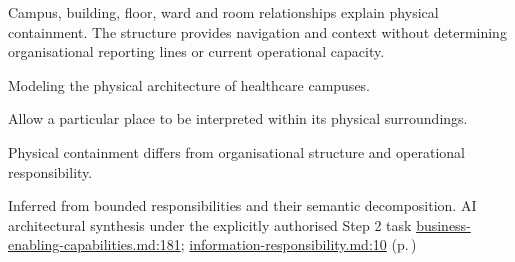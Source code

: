 Campus, building, floor, ward and room relationships explain physical containment. The structure provides navigation and context without determining organisational reporting lines or current operational capacity.



Modeling the physical architecture of healthcare campuses.



Allow a particular place to be interpreted within its physical surroundings.



Physical containment differs from organisational structure and operational responsibility.


Inferred from bounded responsibilities and their semantic decomposition. AI architectural synthesis under the explicitly authorised Step 2 task \hyperref[evidence:e01893359d483acf]{business-enabling-capabilities.md:181}; \hyperref[evidence:be61392fefb4bb10]{information-responsibility.md:10}
 (p.\,\pageref{cap:bec-healthcare-location})

